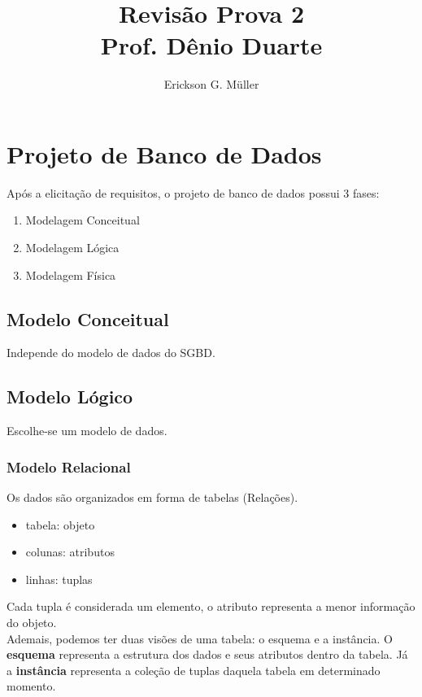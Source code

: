 \documentclass[ ]{article}
\title{Revisão Prova 2\\ Prof. Dênio Duarte}
\author{Erickson G. Müller}
\begin{document}
\maketitle
\newpage
\section{Projeto de Banco de Dados}
	Após a elicitação de requisitos, o projeto de banco de dados possui 3 fases:
	\begin{enumerate}
		\item Modelagem Conceitual
		\item Modelagem Lógica
		\item Modelagem Física
	\end{enumerate}
	
	\subsection{Modelo Conceitual}
		Independe do modelo de dados do SGBD.
	\subsection{Modelo Lógico}
		Escolhe-se um modelo de dados.
		\subsubsection{Modelo Relacional}
			Os dados são organizados em forma de tabelas (Relações).
			\begin{itemize}
				\item tabela: objeto
				\item colunas: atributos
				\item linhas: tuplas
			\end{itemize}			
			Cada tupla é considerada um elemento, o atributo representa a menor informação do objeto.\\
			Ademais, podemos ter duas visões de uma tabela: o esquema e a instância. O \textbf{esquema} representa a estrutura dos dados e seus atributos dentro da tabela. Já a \textbf{instância} representa a coleção de tuplas daquela tabela em determinado momento.
\end{document}
